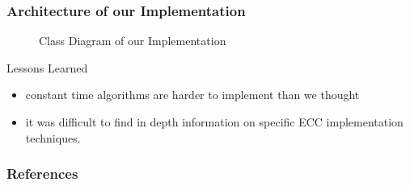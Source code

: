\documentclass{beamer}
\begin{document}
\begin{frame}
\frametitle{Architecture of our Implementation}
\begin{figure}[htp] 
\caption{Class Diagram of our Implementation}
\end{figure}  
\end{frame}

\begin{frame}{Lessons Learned}
\begin{itemize}
	\item constant time algorithms are harder to implement than we thought
	\item it was difficult to find in depth information on specific ECC implementation techniques.
\end{itemize}
\end{frame} 

\begin{frame}[t,allowframebreaks]
	\frametitle{References}
	\printbibliography
\end{frame}
\end{document}
